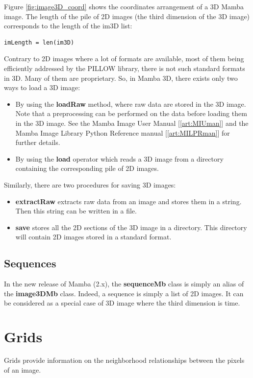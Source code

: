 \documentclass[a4paper,10pt,oneside]{article}
\begin{document}
Figure \ref{fig:image3D_coord} shows the coordinates arrangement of a 3D Mamba image. The length of the pile of 2D images (the third
dimension of the 3D image) corresponds to the length of the im3D list:

\lstset{language=Python}
\begin{lstlisting}
imLength = len(im3D)
\end{lstlisting}

Contrary to 2D images where a lot of formats are available, most of them being efficiently addressed by the
PILLOW library, there is not such standard formats in 3D. Many of them are proprietary. So, in Mamba 3D, there
exists only two ways to load a 3D image:

\begin{itemize}
\item By using the \textbf{loadRaw} method, where raw data are stored in the 3D image. Note that a preprocessing can
be performed on the data before loading them in the 3D image. See the Mamba Image User Manual [\ref{art:MIUman}]
and the Mamba Image Library Python Reference manual [\ref{art:MILPRman}] for further details. 
\item By using the \textbf{load} operator which reads a 3D image from a directory containing the corresponding pile
of 2D images.
\end{itemize}

Similarly, there are two procedures for saving 3D images:

\begin{itemize}
\item \textbf{extractRaw} extracts raw data from an image and stores them in a string. Then this string can be
written in a file.  
\item \textbf{save} stores all the 2D sections of the 3D image in a directory. This directory will contain 2D images
stored in a standard format.
\end{itemize}

\subsection{Sequences}
In the new release of Mamba (2.x), the \textbf{sequenceMb} class is simply an alias of the \textbf{image3DMb} class.
Indeed, a sequence is simply a list of 2D images. It can be considered as a special case of 3D image where
the third dimension is time.

\section{Grids}
Grids provide information on the neighborhood relationships between the pixels of an image.
\end{document}
